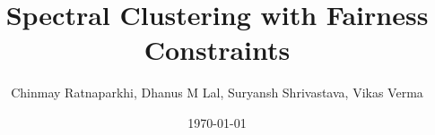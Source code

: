 \documentclass{beamer}
\title{Spectral Clustering with Fairness Constraints}
\author{Chinmay Ratnaparkhi, Dhanus M Lal, Suryansh Shrivastava, Vikas Verma}
\date{\today}
\begin{document}
\begin{frame}
\titlepage
\end{frame}
\end{document}
